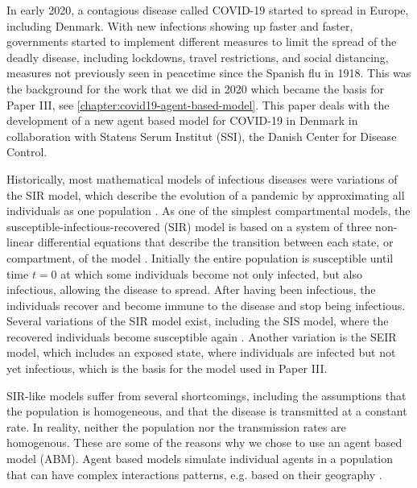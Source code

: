 In early 2020, a contagious disease called COVID-19 started to spread in Europe, including Denmark. With new infections showing up faster and faster, governments started to implement different measures to limit the spread of the deadly disease, including lockdowns, travel restrictions, and social distancing, measures not previously seen in peacetime since the Spanish flu in 1918. This was the background for the work that we did in 2020 which became the basis for Paper III, see \autoref{chapter:covid19-agent-based-model}. This paper deals with the development of a new agent based model for COVID-19 in Denmark in collaboration with Statens Serum Institut (SSI), the Danish Center for Disease Control.

Historically, most mathematical models of infectious diseases were variations of the SIR model, which describe the evolution of a pandemic by approximating all individuals as one population \autocite{kermackContributionMathematicalTheory1927}.
As one of the simplest compartmental models, the susceptible-infectious-recovered (SIR) model is based on a system of three non-linear differential equations that describe the transition between each state, or compartment, of the model \autocite{krogerAnalyticalSolutionSIRmodel2020}. Initially the entire population is susceptible until time $t=0$ at which some individuals become not only infected, but also infectious, allowing the disease to spread. After having been infectious, the individuals recover and become immune to the disease and stop being infectious. Several variations of the SIR model exist, including the SIS model, where the recovered individuals become susceptible again \autocite{hethcoteThreeBasicEpidemiological1989}. Another variation is the SEIR model, which includes an exposed state, where individuals are infected but not yet infectious, which is the basis for the model used in Paper III.

SIR-like models suffer from several shortcomings, including the assumptions that the population is homogeneous, and that the disease is transmitted at a constant rate. In reality, neither the population nor the transmission rates are homogenous. These are some of the reasons why we chose to use an agent based model (ABM). Agent based models simulate individual agents in a population that can have complex interactions patterns, e.g. based on their geography \parencite{wilenskyIntroductionAgentBasedModeling2015}.

